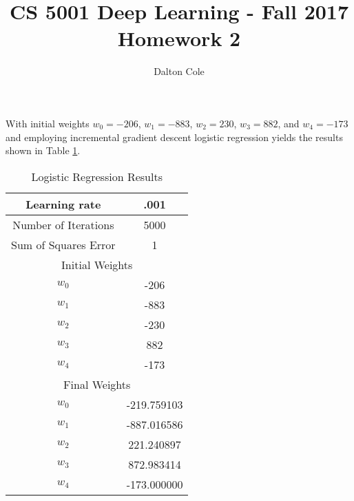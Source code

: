 \documentclass[times]{article}
\begin{document}
	\title{CS 5001 Deep Learning - Fall 2017 \\ Homework 2}
	\author{Dalton Cole}
	\date{}
	\maketitle

	With initial weights $w_0 = -206$, $w_1 = -883$, $w_2 = 230$, $w_3 = 882$, and $w_4 = -173$ and employing incremental gradient descent logistic regression yields the results shown in Table \ref{tab:results}.

	\begin{table}
		\centering
		\caption{Logistic Regression Results}
		\label{tab:results}
		\begin{tabular}{| c | c |}
			\hline
			Learning rate & .001 \\
			\hline
			Number of Iterations & 5000 \\
			\hline
			Sum of Squares Error & 1 \\
			\hline
			\multicolumn{2}{|c|}{Initial Weights} \\
			\hline
			$w_0$ & -206 \\
			\hline
			$w_1$ & -883 \\
			\hline
			$w_2$ & -230 \\
			\hline
			$w_3$ & 882 \\
			\hline
			$w_4$ & -173 \\
			\hline
			\multicolumn{2}{|c|}{Final Weights} \\
			\hline
			$w_0$ & -219.759103 \\
			\hline
			$w_1$ & -887.016586 \\
			\hline
			$w_2$ & 221.240897 \\
			\hline
			$w_3$ & 872.983414 \\
			\hline
			$w_4$ & -173.000000 \\
			\hline
		\end{tabular}
	\end{table}
		
\end{document}
